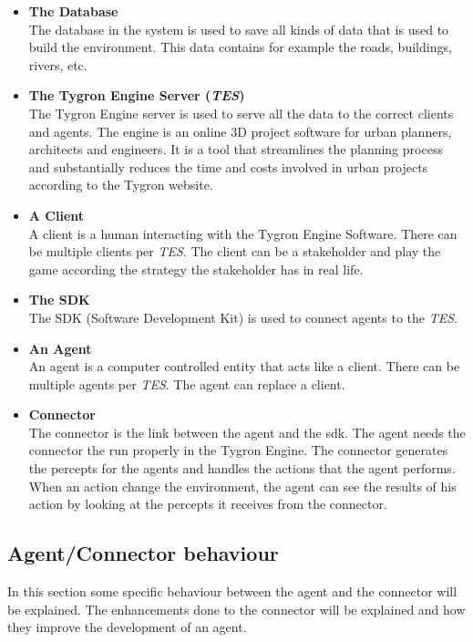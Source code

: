 \begin{itemize}
	\item \textbf{The Database} \\ 
	The database in the system is used to save all kinds of data that is used to build the environment. This data contains for example the roads, buildings, rivers, etc.
	\item \textbf{The Tygron Engine Server (\textit{TES})} \\ 
	The Tygron Engine server is used to serve all the data to the correct clients and agents. The engine is an online 3D project software for urban planners, architects and engineers. It is a tool that streamlines the planning process and substantially reduces the time and costs involved in urban projects according to the Tygron website.
	\item \textbf{A Client} \\
	A client is a human interacting with the Tygron Engine Software. There can be multiple clients per \textit{TES}. The client can be a stakeholder and play the game according the strategy the stakeholder has in real life. 
	\item \textbf{The SDK} \\
	The SDK (Software Development Kit) is used to connect agents to the \textit{TES}.
	\item \textbf{An Agent} \\
	An agent is a computer controlled entity that acts like a client. There can be multiple agents per \textit{TES}. The agent can replace a client.
	\item \textbf{Connector} \\
	The connector is the link between the agent and the sdk. The agent needs the connector the run properly in the Tygron Engine. The connector generates the percepts for the agents and handles the actions that the agent performs. When an action change the environment, the agent can see the results of his action by looking at the percepts it receives from the connector.
\end{itemize}

\newpage
\subsection{Agent/Connector behaviour}
In this section some specific behaviour between the agent and the connector will be explained. The enhancements done to the connector will be explained and how they improve the development of an agent.

